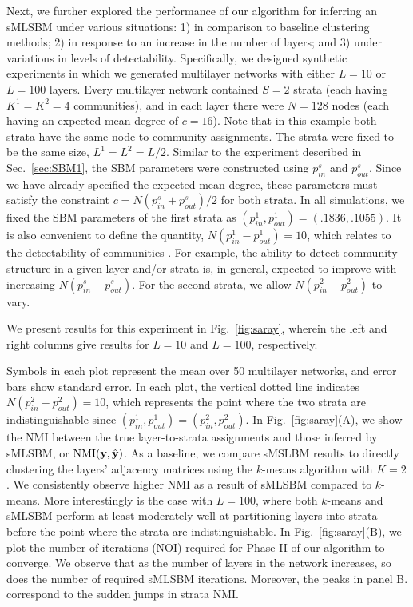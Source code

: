 {Next, we further explored the performance of our algorithm for inferring an sMLSBM under various situations: 1) in comparison to baseline clustering methods; 2) in response to an increase in the number of layers; and 3) under variations in levels of detectability. Specifically, we designed synthetic experiments in which we generated multilayer networks with either $L=10$ or $L=100$ layers. Every multilayer network contained $S=2$ strata (each having $K^1=K^2=4$ communities), and in each layer there were $N=128$ nodes (each having an expected mean degree of $c=16$). Note that in this example both strata have the same node-to-community assignments. The strata were fixed to be the same size, $L^1=L^2=L/2$. Similar to the experiment described in Sec.~\ref{sec:SBM1}, the SBM parameters were constructed using $p_{in}^s$ and $p_{out}^s$. Since we have already specified the expected mean degree, these parameters must satisfy the constraint $c=N(p_{in}^s+p_{out}^s)/2$ for both strata.
%
In all simulations, we fixed the SBM parameters of the first strata as $(p_{in}^1,p_{out}^1)=(.1836,.1055)$. It is also convenient to define the quantity, $N(p_{{in}}^{1}-p_{{out}}^{1})=10$, which relates to the detectability of communities \cite{decelle2011inference}. For example, the ability to detect community structure in a given layer and/or strata is, in general, expected to improve with increasing $N(p_{{in}}^{s}-p_{{out}}^{s})$. For the second strata, we allow $N(p_{{in}}^{2}-p_{{out}}^{2})$ to vary.


We present results for this experiment in Fig.~\ref{fig:saray}, wherein the left and right columns give results for $L=10$ and $L=100$, respectively.

Symbols in each plot represent the mean over 50 multilayer networks, and error bars show standard error. In each plot, the vertical dotted line indicates $N(p_{{in}}^{2}-p_{{out}}^{2})=10$, which represents the point where the two strata are indistinguishable since $(p_{in}^1,p_{out}^1)=(p_{in}^2,p_{out}^2)$.
%
In Fig.~\ref{fig:saray}(A), we show the NMI between the true layer-to-strata assignments and those inferred by sMLSBM, or $\text{NMI}({\bf y},\hat{\bf y})$. As a baseline, we compare sMSLBM results to directly clustering the layers' adjacency matrices using the $k$-means algorithm with $K=2$. We consistently observe higher NMI as a result of sMLSBM compared to $k$-means. More interestingly is the case with $L=100$, where both $k$-means and sMLSBM perform at least moderately well at partitioning layers into strata before the point where the strata are indistinguishable. %
%
In Fig.~\ref{fig:saray}(B), we plot the number of iterations (NOI) required for Phase II of our algorithm to converge. We observe that as the number of layers in the network increases, so does the number of required sMLSBM iterations. Moreover, the peaks in panel B. correspond to the sudden jumps in strata NMI. 

}
